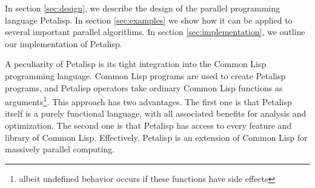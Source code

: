 In section \ref{sec:design}, we describe the design of the parallel programming
language Petalisp. In section \ref{sec:examples} we show how it can be
applied to several important parallel algorithms. In section
\ref{sec:implementation}, we outline our implementation of Petalisp.

A peculiarity of Petalisp is its tight integration into the Common Lisp
programming language. Common Lisp programs are used to create Petalisp
programs, and Petalisp operators take ordinary Common Lisp functions as
arguments\footnote{albeit undefined behavior occurs if these functions have
  side effects}. This approach has two advantages. The first one is that
Petalisp itself is a purely functional language, with all associated
benefits for analysis and optimization. The second one is that Petalisp has
access to every feature and library of Common Lisp. Effectively, Petalisp
is an extension of Common Lisp for massively parallel computing.
